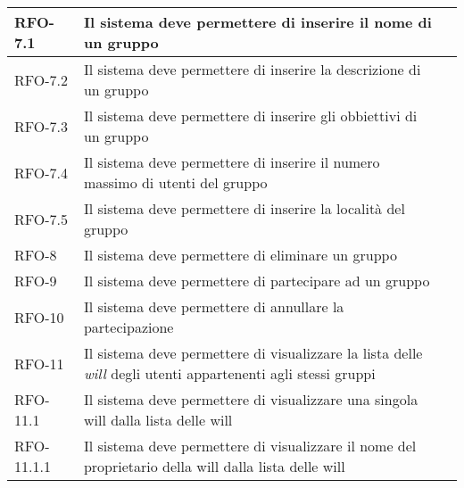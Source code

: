 \begin{center}
{\begin{longtable}{
        |>{\centering\arraybackslash}p{60pt}
        |>{\centering\arraybackslash}p{220pt}
        |>{\centering\arraybackslash}p{60pt}|}
        RFO-7.1     & Il sistema deve permettere di inserire il nome di un gruppo & \nameref{sub:inserimento-nome-gruppo}\\
        \hline
        
        RFO-7.2     & Il sistema deve permettere di inserire la descrizione di un gruppo & \nameref{sub:inserimento-descrizione-gruppo}\\
        \hline
        
        
        RFO-7.3     & Il sistema deve permettere di inserire gli obbiettivi di un gruppo & \nameref{sub:inserimento-obbiettivi-gruppo}\\
        \hline
        
        RFO-7.4     & Il sistema deve permettere di inserire il numero massimo di utenti del gruppo & \nameref{sub:inserimento-numero-utenti-gruppo}\\
        \hline
        
        RFO-7.5     & Il sistema deve permettere di inserire la località del gruppo & \nameref{sub:inserimento-località-gruppo}\\
        \hline
        
        RFO-8     & Il sistema deve permettere di eliminare un gruppo & \nameref{uc:scenario-elimina-gruppo}\\
        \hline
        
        RFO-9     & Il sistema deve permettere di partecipare ad un gruppo & \nameref{uc:scenario-partecipa-gruppo}\\
        \hline
        
        RFO-10     & Il sistema deve permettere di annullare la partecipazione & \nameref{uc:scenario-annulla-partecipazione}\\
        \hline
        
        RFO-11     & Il sistema deve permettere di visualizzare la lista delle \textit{will} degli utenti appartenenti agli stessi gruppi & \nameref{uc:scenario-visualizzazione-will}\\
        
        RFO-11.1     & Il sistema deve permettere di visualizzare una singola \gls{will} dalla lista delle \gls{will} & \nameref{sub:visualizzazione-singola-will}\\
        \hline
        
        RFO-11.1.1     & Il sistema deve permettere di visualizzare il nome del proprietario della \gls{will} dalla lista delle \gls{will} & \nameref{subsub:visualizzazione-will-nome-proprietario}\\
        

\end{longtable}}
\end{center}
